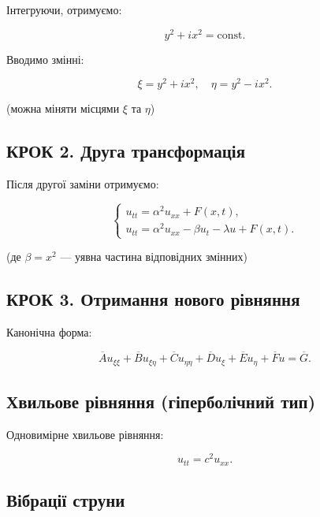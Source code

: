 \documentclass[
  ukrainian,
]{article}
\begin{document}
Інтегруючи, отримуємо:

\[
y^2 + i x^2 = \text{const}.
\]

Вводимо змінні:

\[
\xi = y^2 + i x^2, \quad \eta = y^2 - i x^2.
\]

(можна міняти місцями \(\xi\) та \(\eta\))

\subsection{КРОК 2. Друга
трансформація}\label{ux43aux440ux43eux43a-2.-ux434ux440ux443ux433ux430-ux442ux440ux430ux43dux441ux444ux43eux440ux43cux430ux446ux456ux44f}

Після другої заміни отримуємо:

\[
\begin{cases}
u_{tt} = \alpha^2 u_{xx} + F(x,t), \\
u_{tt} = \alpha^2 u_{xx} - \beta u_t - \lambda u + F(x,t).
\end{cases}
\]

(де \(\beta = x^2\) --- уявна частина відповідних змінних)

\subsection{КРОК 3. Отримання нового
рівняння}\label{ux43aux440ux43eux43a-3.-ux43eux442ux440ux438ux43cux430ux43dux43dux44f-ux43dux43eux432ux43eux433ux43e-ux440ux456ux432ux43dux44fux43dux43dux44f}

Канонічна форма:

\[
\overline{A}u_{\xi\xi} + \overline{B}u_{\xi\eta} + \overline{C}u_{\eta\eta} + \overline{D}u_{\xi} + \overline{E}u_{\eta} + \overline{F}u = \overline{G}.
\]

\subsection{Хвильове рівняння (гіперболічний
тип)}\label{ux445ux432ux438ux43bux44cux43eux432ux435-ux440ux456ux432ux43dux44fux43dux43dux44f-ux433ux456ux43fux435ux440ux431ux43eux43bux456ux447ux43dux438ux439-ux442ux438ux43f}

Одновимірне хвильове рівняння:

\[
u_{tt} = c^2 u_{xx}.
\]

\subsection{Вібрації
струни}\label{ux432ux456ux431ux440ux430ux446ux456ux457-ux441ux442ux440ux443ux43dux438}
\end{document}
